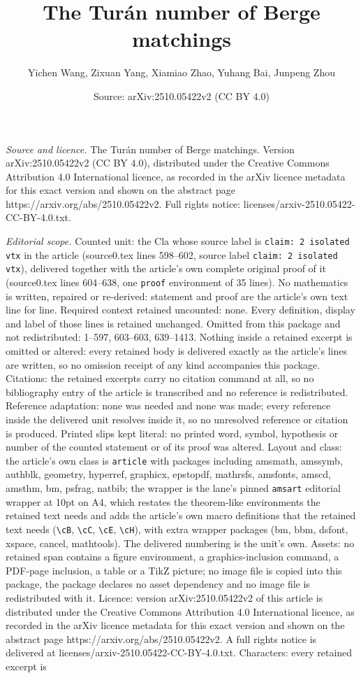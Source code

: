 \documentclass[10pt,a4paper]{amsart}
\title[The Tur\'{a}n number of Berge matchings]{The Tur\'{a}n number of Berge matchings}
\author{Yichen Wang, Zixuan Yang, Xiamiao Zhao, Yuhang Bai, Junpeng Zhou}
\date{Source: arXiv:2510.05422v2 (CC BY 4.0)}
\begin{document}
\maketitle

\noindent\emph{Source and licence.} The Tur\'{a}n number of Berge matchings. Version arXiv:2510.05422v2 (CC BY 4.0), distributed under the Creative Commons Attribution 4.0 International licence, as recorded in the arXiv licence metadata for this exact version and shown on the abstract page https://arxiv.org/abs/2510.05422v2. Full rights notice: licenses/arxiv-2510.05422-CC-BY-4.0.txt.\par\smallskip

\noindent\textit{Editorial scope.} Counted unit: the Cla whose source label is \texttt{claim: 2 isolated vtx} in the article (source0.tex lines 598--602, source label \texttt{claim: 2 isolated vtx}), delivered together with the article's own complete original proof of it (source0.tex lines 604--638, one \texttt{proof} environment of 35 lines). No mathematics is written, repaired or re-derived: statement and proof are the article's own text line for line. Required context retained uncounted: none. Every definition, display and label of those lines is retained unchanged. Omitted from this package and not redistributed: 1--597, 603--603, 639--1413. Nothing inside a retained excerpt is omitted or altered: every retained body is delivered exactly as the article's lines are written, so no omission receipt of any kind accompanies this package. Citations: the retained excerpts carry no citation command at all, so no bibliography entry of the article is transcribed and no reference is redistributed. Reference adaptation: none was needed and none was made; every reference inside the delivered unit resolves inside it, so no unresolved reference or citation is produced. Printed slips kept literal: no printed word, symbol, hypothesis or number of the counted statement or of its proof was altered. Layout and class: the article's own class is \texttt{article} with packages including amsmath, amssymb, authblk, geometry, hyperref, graphicx, epstopdf, mathrsfs, amsfonts, amscd, amsthm, bm, psfrag, natbib; the wrapper is the lane's pinned \texttt{amsart} editorial wrapper at 10pt on A4, which restates the theorem-like environments the retained text needs and adds the article's own macro definitions that the retained text needs (\texttt{\textbackslash cB}, \texttt{\textbackslash cC}, \texttt{\textbackslash cE}, \texttt{\textbackslash cH}), with extra wrapper packages (bm, bbm, dsfont, xspace, cancel, mathtools). The delivered numbering is the unit's own. Assets: no retained span contains a figure environment, a graphics-inclusion command, a PDF-page inclusion, a table or a TikZ picture; no image file is copied into this package, the package declares no asset dependency and no image file is redistributed with it. Licence: version arXiv:2510.05422v2 of this article is distributed under the Creative Commons Attribution 4.0 International licence, as recorded in the arXiv licence metadata for this exact version and shown on the abstract page https://arxiv.org/abs/2510.05422v2. A full rights notice is delivered at licenses/arxiv-2510.05422-CC-BY-4.0.txt. Characters: every retained excerpt is 
\end{document}
